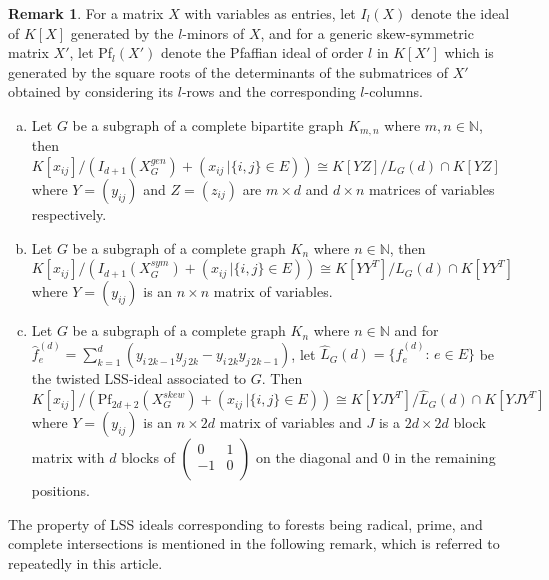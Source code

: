 \documentclass[11pt,a4paper,reqno]{amsart}
\theoremstyle{definition}
\newtheorem{remark}[thm]{Remark}
\numberwithin{equation}{section}
\def\NN{\mathbb{N}}
\begin{document}
\begin{remark} \label{Isomorphisms}
For a matrix $X$ with variables as entries, let $I_l(X)$ denote the ideal of $K[X]$ generated by the $l$-minors of $X$, and for a generic skew-symmetric matrix $X'$, let Pf$_{l}(X')$ denote the Pfaffian ideal of order $l$ in $K[X']$ which is generated by the square roots of the determinants of the submatrices of $X'$ obtained by considering its $l$-rows and the corresponding $l$-columns.
    \begin{enumerate} [(a)]
    \item \label{iso1} Let $G$ be a subgraph of a complete bipartite graph $K_{m,n}$ where $m,n \in \NN$, then $K[x_{ij}]/(I_{d+1}(X^{gen}_{G})+(x_{ij} \, | \{i,j\} \in E)) \cong K[YZ]/L_G(d) \cap K[YZ]$ where $Y=(y_{ij})$ and $Z=(z_{ij})$ are $m \times d$ and $d \times n$ matrices of variables respectively.
    \item \label{iso2} Let $G$ be a subgraph of a complete graph $K_{n}$ where $n \in \NN$, then $K[x_{ij}]/(I_{d+1}(X^{sym}_{G})+(x_{ij} \, | \{i,j\} \in E)) \cong K[YY^{T}]/L_G(d) \cap K[YY^{T}]$ where $Y=(y_{ij})$ is an $n \times n$ matrix of variables.
    \item \label{iso3} Let $G$ be a subgraph of a complete graph $K_{n}$ where $n \in \NN$ and for $\hat{f}_e^{(d)}=\sum_{k=1}^d(y_{i\, 2k-1}y_{j \, 2k}-y_{i \, 2k}y_{j \, 2k-1})$, let $\hat{L}_G(d)=\{ \hat{f}_e^{(d)}: \, e \in E \}$ be the twisted LSS-ideal associated to $G$. 
    Then $$K[x_{ij}]/(\text{Pf}_{2d+2}(X^{skew}_{G})+(x_{ij} \, | \{i,j\} \in E)) \cong K[YJY^{T}]/ \hat{L}_G(d) \cap K[YJY^{T}]$$ where $Y=(y_{ij})$ is an $n \times 2d$ matrix of variables and $J$ is a $2d \times 2d$ block matrix with $d$ blocks of $\begin{pmatrix}
                 0 & 1 \\
                -1 & 0 \\
        \end{pmatrix}$ on the diagonal and $0$ in the remaining positions. 
\end{enumerate}
\end{remark}

 

\vspace{2mm}


The property of LSS ideals corresponding to forests being radical, prime, and complete intersections is mentioned in the following remark, which is referred to repeatedly in this article. 
\end{document}
